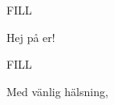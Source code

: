 \documentclass[
	pagenumber=false, %
	parskip=half, %
	fromalign=right, %
	foldmarks=true, %
	addrfield=true %
	]{scrlttr2}
\date{\today}
\begin{document}

\begin{letter}{FILL} %


\opening{Hej på er!}

FILL

\closing{Med vänlig hälsning,}


\end{letter}
\end{document}
